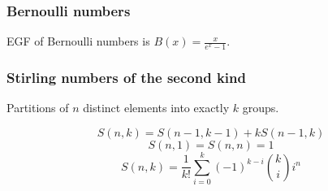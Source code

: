 \subsubsection{Bernoulli numbers}
EGF of Bernoulli numbers is $B(x) = \frac{x}{e^x - 1}$.

\subsubsection{Stirling numbers of the second kind}
Partitions of $n$ distinct elements into exactly $k$ groups. 

\[ S(n, k) = S(n - 1, k - 1) + kS(n - 1, k) \]
\[ S(n, 1) = S(n, n) = 1 \]
\[ S(n, k) = \frac{1}{k!}\sum_{i=0}^{k}(-1)^{k-i}{k \choose i}i^n \]
